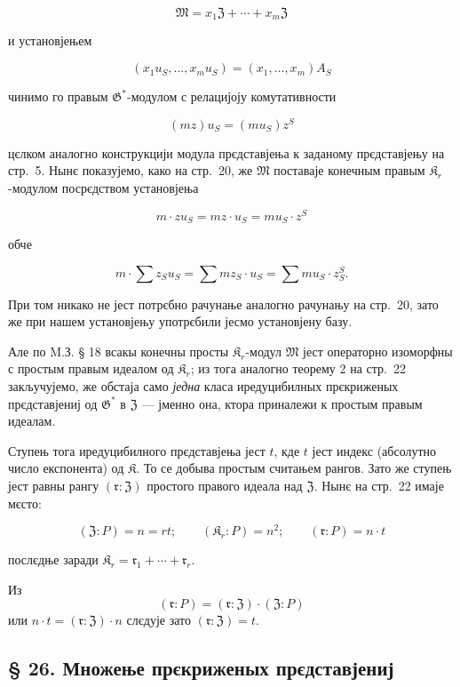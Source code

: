 \documentclass[11pt]{article}
\begin{document}
\[\mathfrak{M}=x_1\mathfrak{Z}+\cdots+x_m\mathfrak{Z}\]

и установјењем

\[(x_1u_S,\ldots,x_mu_S)=(x_1,\ldots,x_m)A_S\]

чинимо го правым \(\mathfrak G^*\)-модулом с релацијоју комутативности

\[(mz) u_S = (mu_S) z^S\]

цєлком аналогно конструкцији модула прєдставјења к заданому прєдставјењу на стр.~5. Нынє показујемо, како на стр.~20, же \(\mathfrak{M}\) поставаје конечным правым \(\mathfrak K_r\)-модулом посрєдством установјења

\[m \cdot z u_S = mz \cdot u_S = mu_S \cdot z^S\]

обче

\[m \cdot \sum z_S u_S = \sum m z_S \cdot u_S = \sum m u_S \cdot z_S^S.\]

При том никако не јест потрєбно рачунање аналогно рачунању на стр.~20, зато же при нашем установјењу употрєбили јесмо установјену базу.

Але по M.З. § 18 всакы конечны просты \(\mathfrak K_r\)-модул \(\mathfrak{M}\) јест операторно изоморфны с простым правым идеалом од \(\mathfrak K_r\); из тога аналогно теорему 2 на стр.~22 закључујемо, же обстаја само \emph{једна} класа иредуцибилных прєкриженых прєдставјениј од \(\mathfrak{G}^*\) в \(\mathfrak Z\) --- јменно она, ктора приналежи к простым правым идеалам.

Ступењ тога иредуцибилного прєдставјења јест \(t\), кде \(t\) јест индекс (абсолутно число експонента) од \(\mathfrak K\). То се добыва простым считањем рангов. Зато же ступењ јест равны рангу \((\mathfrak r:\mathfrak Z)\) простого правого идеала над \(\mathfrak Z\). Нынє на стр.~22 имаје мєсто:

\[
(\mathfrak Z:P)=n=rt;\qquad (\mathfrak K_r:P)=n^2;\qquad (\mathfrak r:P)=n\cdot t
\]

послєдње заради \(\mathfrak K_r = \mathfrak{r}_1 + \cdots + \mathfrak{r}_r\).

Из
\[(\mathfrak{r}: P) = (\mathfrak{r}: \mathfrak Z) \cdot (\mathfrak Z: P)\]
или \(n \cdot t = (\mathfrak{r}: \mathfrak Z) \cdot n\) слєдује зато \((\mathfrak{r}: \mathfrak Z) = t\).

\subsection*{§ 26. Множење прєкриженых прєдставјениј}\label{multiplikation-der-verschraenkten-darstellungen}
\end{document}

